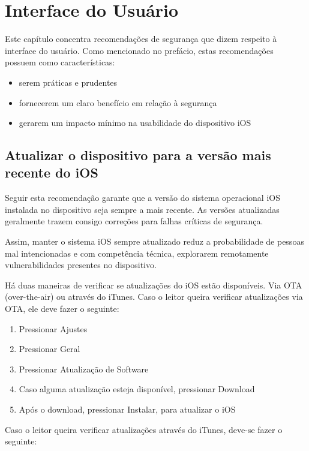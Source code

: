 \chapter{Interface do Usu\'ario}

Este cap\'itulo concentra recomenda\c c\~oes de seguran\c ca que dizem respeito \`a interface do usu\'ario. Como mencionado no pref\'acio, estas recomenda\c c\~oes possuem como caracter\'isticas:

\begin{itemize}
\item serem pr\'aticas e prudentes
\item fornecerem um claro benef\'icio em rela\c c\~ao \`a seguran\c ca
\item gerarem um impacto m\'inimo na usabilidade do dispositivo iOS
\end{itemize}

\section{Atualizar o dispositivo para a vers\~ao mais recente do iOS}

Seguir esta recomenda\c c\~ao garante que a vers\~ao do sistema operacional iOS instalada no dispositivo seja sempre a mais recente. As vers\~oes atualizadas geralmente trazem consigo corre\c c\~oes para falhas cr\'iticas de seguran\c ca. 

Assim, manter o sistema iOS sempre atualizado reduz a probabilidade de pessoas mal intencionadas e com compet\^encia t\'ecnica, explorarem remotamente vulnerabilidades presentes no dispositivo. 

H\'a duas maneiras de verificar se atualiza\c c\~oes do iOS est\~ao dispon\'iveis. Via OTA (over-the-air) ou atrav\'es do iTunes. Caso o leitor queira verificar atualiza\c c\~oes via OTA, ele deve fazer o seguinte: 

\begin{enumerate}
\item Pressionar Ajustes
\item Pressionar Geral
\item Pressionar Atualiza\c c\~ao de Software
\item Caso alguma atualiza\c c\~ao esteja dispon\'ivel, pressionar Download
\item Ap\'os o download, pressionar Instalar, para atualizar o iOS
\end{enumerate}

Caso o leitor queira verificar atualiza\c c\~oes atrav\'es do iTunes, deve-se fazer o seguinte:

